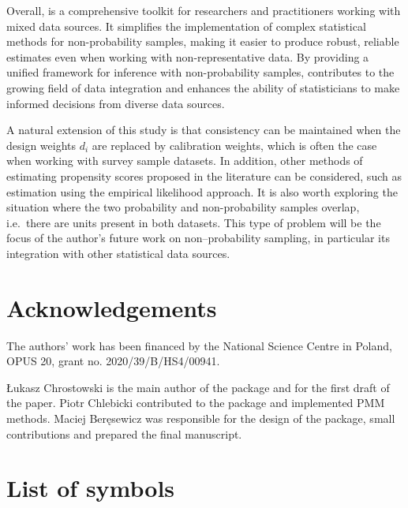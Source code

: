\documentclass[
]{jss}
\begin{document}
Overall,  is a comprehensive toolkit for researchers and
practitioners working with mixed data sources. It simplifies the
implementation of complex statistical methods for non-probability
samples, making it easier to produce robust, reliable estimates even
when working with non-representative data. By providing a unified
framework for inference with non-probability samples, 
contributes to the growing field of data integration and enhances the
ability of statisticians to make informed decisions from diverse data
sources.

A natural extension of this study is that consistency can be maintained
when the design weights \(d_i\) are replaced by calibration weights,
which is often the case when working with survey sample datasets. In
addition, other methods of estimating propensity scores proposed in the
literature can be considered, such as estimation using the empirical
likelihood approach. It is also worth exploring the situation where the
two probability and non-probability samples overlap, i.e.~there are
units present in both datasets. This type of problem will be the focus
of the author's future work on non--probability sampling, in particular
its integration with other statistical data sources.

\section{Acknowledgements}\label{sec-acknowledgements}

The authors' work has been financed by the National Science Centre in
Poland, OPUS 20, grant no. 2020/39/B/HS4/00941.

Łukasz Chrostowski is the main author of the package and for the first
draft of the paper. Piotr Chlebicki contributed to the package and
implemented PMM methods. Maciej Beręsewicz was responsible for the
design of the package, small contributions and prepared the final
manuscript.

\clearpage

\appendix

\section{List of symbols}\label{list-of-symbols}
\end{document}
